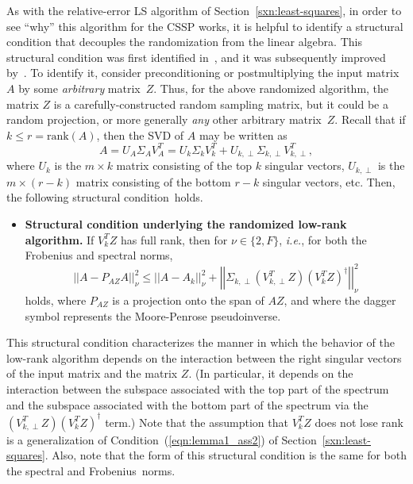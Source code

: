 \documentclass[twoside]{article}
\begin{document}
As with the relative-error LS algorithm of Section~\ref{sxn:least-squares}, 
in order to see ``why'' this algorithm for the CSSP works, it is helpful to 
identify a structural condition that decouples the randomization from the 
linear algebra.
This structural condition was first identified 
in~\cite{BMD09_CSSP_SODA,BMD08_CSSP_TRv2}, and it was subsequently improved 
by~\cite{HMT09_SIREV}.
To identify it, consider preconditioning or postmultiplying the input matrix 
$A$ by some \emph{arbitrary} matrix~$Z$.
Thus, for the above randomized algorithm, the matrix $Z$ is a 
carefully-constructed random sampling matrix, but it could be a random 
projection, or more generally \emph{any} other arbitrary matrix~$Z$.
Recall that if $k \leq r = \mbox{rank}(A)$, then the SVD of $A$ may be 
written as
\begin{equation*} 
A = U_A \Sigma_A V_A^T 
= U_k \Sigma_k V_k^T + U_{k,\perp} \Sigma_{k,\perp} V_{k,\perp}^T     ,
\end{equation*}
where $U_k$ is the $m \times k$ matrix consisting of the top $k$ singular 
vectors, $U_{k,\perp}$ is the $m \times (r-k)$ matrix consisting of the bottom
$r-k$ singular vectors, etc.
Then, the following structural condition~holds.
\begin{itemize}
\item
\textbf{Structural condition underlying the randomized low-rank algorithm.}
If $V_k^TZ$ has full rank, then for $\nu\in\{2,F\}$, \emph{i.e.}, for both the 
Frobenius and spectral norms,
\begin{equation}
\label{eqn:struct-cond-low-rank}
\left|\left|A-P_{AZ}A\right|\right|_{\nu}^{2} 
   \leq \left|\left|A-A_k\right|\right|_{\nu}^{2} 
      + \left|\left| \Sigma_{k,\perp}\left(V_{k,\perp}^TZ\right)\left(V_{k}^TZ\right)^{\dagger} \right|\right|_{\nu}^{2} 
\end{equation}
holds, where $P_{AZ}$ is a projection onto the span of $AZ$, and where the 
dagger symbol represents the Moore-Penrose pseudoinverse.
\end{itemize}
This structural condition characterizes the manner in which the behavior of 
the low-rank algorithm depends on the interaction between the right singular 
vectors of the input matrix and the matrix $Z$.
(In particular, it depends on the interaction between the subspace 
associated with the top part of the spectrum and the subspace associated 
with the bottom part of the spectrum via the 
$\left(V_{k,\perp}^TZ\right)\left(V_{k}^TZ\right)^{\dagger} $ term.)
Note that the assumption that $V_k^TZ$ does not lose rank is a
generalization of Condition~(\ref{eqn:lemma1_ass2}) of 
Section~\ref{sxn:least-squares}.
Also, note that the form of this structural condition is the same for both 
the spectral and Frobenius~norms.
\end{document}
